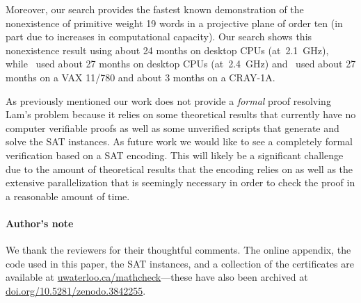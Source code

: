 \documentclass[letterpaper]{article}
\begin{document}
Moreover, our search provides the fastest known demonstration
of the nonexistence of primitive weight 19 words in a projective
plane of order ten (in part due to
increases in computational capacity).  Our search shows
this nonexistence result using about 24 months
on desktop CPUs (at~2.1~GHz), while~\cite{roy2011confirmation} used about
27 months on desktop CPUs (at~2.4~GHz)
and~\cite{lam1989non} used about 27 months
on a VAX 11/780 and about 3 months on a CRAY-1A.

As previously mentioned our work does not provide
a \emph{formal} proof resolving Lam's problem because it relies
on some theoretical results that currently have no computer
verifiable proofs as well as some unverified scripts that generate
and solve the SAT instances.  As future work we would like
to see a completely formal verification based on a SAT encoding.
This will likely be a significant challenge due to the 
amount of theoretical results that the encoding relies on
as well as the extensive parallelization that is seemingly necessary
in order to check the proof in a reasonable amount of time.

\paragraph{Author's note}
We thank the reviewers for their
thoughtful comments.
The online appendix, the code used in this paper, the SAT instances,
and a collection of the certificates
are available at \url{uwaterloo.ca/mathcheck}---these
have also been archived at \url{doi.org/10.5281/zenodo.3842255}.


\end{document}
